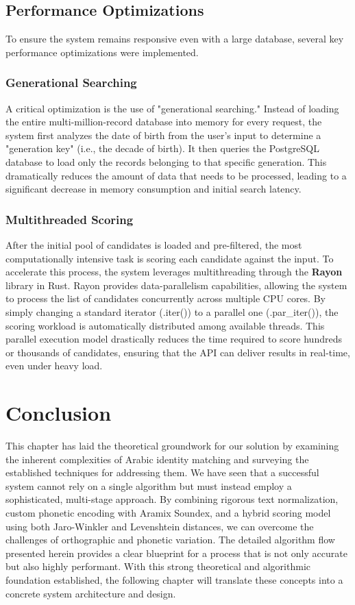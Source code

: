 \subsection{Performance Optimizations}
To ensure the system remains responsive even with a large database, several key performance optimizations were implemented.

\subsubsection{Generational Searching}
A critical optimization is the use of "generational searching." Instead of loading the entire multi-million-record database into memory for every request, the system first analyzes the date of birth from the user's input to determine a "generation key" (i.e., the decade of birth). It then queries the PostgreSQL database to load only the records belonging to that specific generation. This dramatically reduces the amount of data that needs to be processed, leading to a significant decrease in memory consumption and initial search latency.

\subsubsection{Multithreaded Scoring}
After the initial pool of candidates is loaded and pre-filtered, the most computationally intensive task is scoring each candidate against the input. To accelerate this process, the system leverages multithreading through the \textbf{Rayon} library in Rust. Rayon provides data-parallelism capabilities, allowing the system to process the list of candidates concurrently across multiple CPU cores. By simply changing a standard iterator (.iter()) to a parallel one (.par_iter()), the scoring workload is automatically distributed among available threads. This parallel execution model drastically reduces the time required to score hundreds or thousands of candidates, ensuring that the API can deliver results in real-time, even under heavy load.

\section{Conclusion}
This chapter has laid the theoretical groundwork for our solution by examining the inherent complexities of Arabic identity matching and surveying the established techniques for addressing them. We have seen that a successful system cannot rely on a single algorithm but must instead employ a sophisticated, multi-stage approach. By combining rigorous text normalization, custom phonetic encoding with Aramix Soundex, and a hybrid scoring model using both Jaro-Winkler and Levenshtein distances, we can overcome the challenges of orthographic and phonetic variation. The detailed algorithm flow presented herein provides a clear blueprint for a process that is not only accurate but also highly performant. With this strong theoretical and algorithmic foundation established, the following chapter will translate these concepts into a concrete system architecture and design.